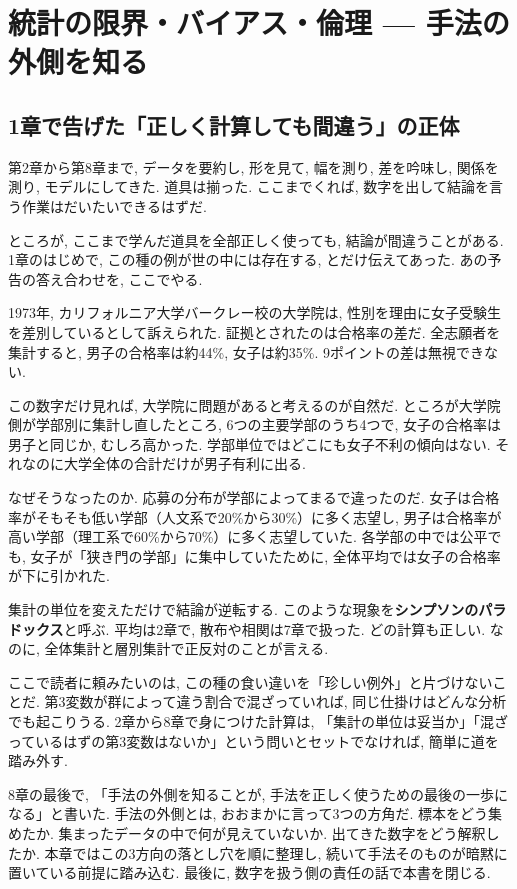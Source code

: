 ﻿\section{統計の限界・バイアス・倫理 — 手法の外側を知る}

\subsection{1章で告げた「正しく計算しても間違う」の正体}

第2章から第8章まで, データを要約し, 形を見て, 幅を測り, 差を吟味し, 関係を測り, モデルにしてきた.
道具は揃った. ここまでくれば, 数字を出して結論を言う作業はだいたいできるはずだ.

ところが, ここまで学んだ道具を全部正しく使っても, 結論が間違うことがある.
1章のはじめで, この種の例が世の中には存在する, とだけ伝えてあった.
あの予告の答え合わせを, ここでやる.

1973年, カリフォルニア大学バークレー校の大学院は, 性別を理由に女子受験生を差別しているとして訴えられた.
証拠とされたのは合格率の差だ.
全志願者を集計すると, 男子の合格率は約44\%, 女子は約35\%.
9ポイントの差は無視できない.

この数字だけ見れば, 大学院に問題があると考えるのが自然だ.
ところが大学院側が学部別に集計し直したところ, 6つの主要学部のうち4つで, 女子の合格率は男子と同じか, むしろ高かった.
学部単位ではどこにも女子不利の傾向はない. それなのに大学全体の合計だけが男子有利に出る.

なぜそうなったのか. 応募の分布が学部によってまるで違ったのだ.
女子は合格率がそもそも低い学部（人文系で20\%から30\%）に多く志望し, 男子は合格率が高い学部（理工系で60\%から70\%）に多く志望していた.
各学部の中では公平でも, 女子が「狭き門の学部」に集中していたために, 全体平均では女子の合格率が下に引かれた.

集計の単位を変えただけで結論が逆転する.
このような現象を\textbf{シンプソンのパラドックス}と呼ぶ.
平均は2章で, 散布や相関は7章で扱った. どの計算も正しい.
なのに, 全体集計と層別集計で正反対のことが言える.

ここで読者に頼みたいのは, この種の食い違いを「珍しい例外」と片づけないことだ.
第3変数が群によって違う割合で混ざっていれば, 同じ仕掛けはどんな分析でも起こりうる.
2章から8章で身につけた計算は, 「集計の単位は妥当か」「混ざっているはずの第3変数はないか」という問いとセットでなければ, 簡単に道を踏み外す.

8章の最後で, 「手法の外側を知ることが, 手法を正しく使うための最後の一歩になる」と書いた.
手法の外側とは, おおまかに言って3つの方角だ.
標本をどう集めたか. 集まったデータの中で何が見えていないか. 出てきた数字をどう解釈したか.
本章ではこの3方向の落とし穴を順に整理し, 続いて手法そのものが暗黙に置いている前提に踏み込む.
最後に, 数字を扱う側の責任の話で本書を閉じる.

